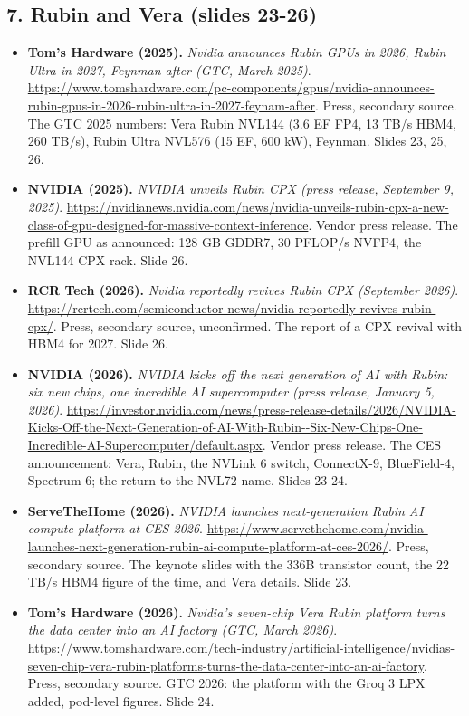 \documentclass[11pt,letterpaper]{article}
\begin{document}
\subsection*{7. Rubin and Vera (slides 23-26)}
\begin{itemize}[leftmargin=1.2em,itemsep=3pt]\sloppy
\item \textbf{Tom's Hardware (2025).} \textit{Nvidia announces Rubin GPUs in 2026, Rubin Ultra in 2027, Feynman after (GTC, March 2025)}. \url{https://www.tomshardware.com/pc-components/gpus/nvidia-announces-rubin-gpus-in-2026-rubin-ultra-in-2027-feynam-after}. Press, secondary source. The GTC 2025 numbers: Vera Rubin NVL144 (3.6 EF FP4, 13 TB/s HBM4, 260 TB/s), Rubin Ultra NVL576 (15 EF, 600 kW), Feynman. Slides 23, 25, 26.
\item \textbf{NVIDIA (2025).} \textit{NVIDIA unveils Rubin CPX (press release, September 9, 2025)}. \url{https://nvidianews.nvidia.com/news/nvidia-unveils-rubin-cpx-a-new-class-of-gpu-designed-for-massive-context-inference}. Vendor press release. The prefill GPU as announced: 128 GB GDDR7, 30 PFLOP/s NVFP4, the NVL144 CPX rack. Slide 26.
\item \textbf{RCR Tech (2026).} \textit{Nvidia reportedly revives Rubin CPX (September 2026)}. \url{https://rcrtech.com/semiconductor-news/nvidia-reportedly-revives-rubin-cpx/}. Press, secondary source, unconfirmed. The report of a CPX revival with HBM4 for 2027. Slide 26.
\item \textbf{NVIDIA (2026).} \textit{NVIDIA kicks off the next generation of AI with Rubin: six new chips, one incredible AI supercomputer (press release, January 5, 2026)}. \url{https://investor.nvidia.com/news/press-release-details/2026/NVIDIA-Kicks-Off-the-Next-Generation-of-AI-With-Rubin--Six-New-Chips-One-Incredible-AI-Supercomputer/default.aspx}. Vendor press release. The CES announcement: Vera, Rubin, the NVLink 6 switch, ConnectX-9, BlueField-4, Spectrum-6; the return to the NVL72 name. Slides 23-24.
\item \textbf{ServeTheHome (2026).} \textit{NVIDIA launches next-generation Rubin AI compute platform at CES 2026}. \url{https://www.servethehome.com/nvidia-launches-next-generation-rubin-ai-compute-platform-at-ces-2026/}. Press, secondary source. The keynote slides with the 336B transistor count, the 22 TB/s HBM4 figure of the time, and Vera details. Slide 23.
\item \textbf{Tom's Hardware (2026).} \textit{Nvidia's seven-chip Vera Rubin platform turns the data center into an AI factory (GTC, March 2026)}. \url{https://www.tomshardware.com/tech-industry/artificial-intelligence/nvidias-seven-chip-vera-rubin-platforms-turns-the-data-center-into-an-ai-factory}. Press, secondary source. GTC 2026: the platform with the Groq 3 LPX added, pod-level figures. Slide 24.

\end{itemize}
\end{document}
